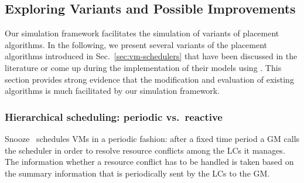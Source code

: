\subsection{Exploring Variants and Possible Improvements}


Our simulation framework facilitates the simulation of variants of
placement algorithms. In the following, we present several variants of
the placement algorithms introduced in Sec.~\ref{sec:vm-schedulers}
that have been discussed in the literature or come up during the
implementation of their models using \vmps. This section provides
strong evidence that the modification and evaluation of existing
algorithms is much facilitated by our simulation framework.





\subsubsection{Hierarchical scheduling: periodic vs.\  reactive}

Snooze~\cite{feller:ccgrid12} schedules VMs in a periodic fashion:
after a fixed time period a GM calls the scheduler in order to resolve
resource conflicts among the LCs it manages. The information whether a
resource conflict has to be handled is taken based on the summary
information that is periodically sent by the LCs to the GM.

